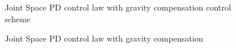 \documentclass{article}
\begin{document}
\begin{figure}[H]
    \noindent

    \caption{Joint Space PD control law with gravity compensation control scheme}
    \label{fig:js_PD_gravity_compensation_scheme}
\end{figure}

\begin{figure}[H]
    \noindent

    \caption{Joint Space PD control law with gravity compensation}
    \label{fig:js_PD_gravity_compensation_joints}
\end{figure}
\end{document}
